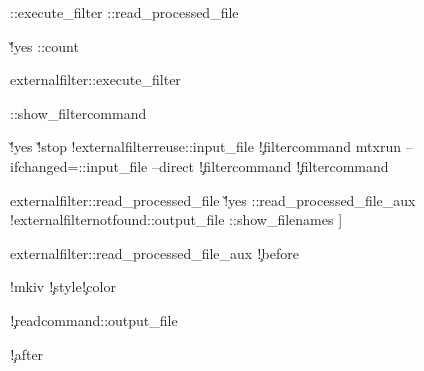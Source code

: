      \externalfilter::execute_filter
     \externalfilter::read_processed_file
     \endgroup 

     \v!yes
          {\doglobal\expandafter\increment\csname\externalfilter::count\endcsname}

     \dorechecknextindentation
\stoptexdefinition


\starttexdefinition externalfilter::execute_filter

   \externalfilter::show_filtercommand

   \v!yes
       {\v!stop
            {\showmessage\m!externalfilter{reuse}\externalfilter::input_file}
            {
               {
                   {
                    \executesystemcommand
                      {\externalfilterparameter\c!filtercommand}}
                   {\executesystemcommand
                    {mtxrun --ifchanged=\externalfilter::input_file\space 
                        --direct \externalfilterparameter\c!filtercommand}}}}}
       {\executesystemcommand
          {\externalfilterparameter\c!filtercommand}}
\stoptexdefinition


\starttexdefinition externalfilter::read_processed_file
    \v!yes
       {
           {\externalfilter::read_processed_file_aux}
           {\showmessage\m!externalfilter{notfound}\externalfilter::output_file 
            \externalfilter::show_filenames
            \blank
              {\tttf [[\getmessage\m!externalfilter{missing}]]}
            \blank}}
\stoptexdefinition

\starttexdefinition externalfilter::read_processed_file_aux
   \externalfilterparameter\c!before

   \begingroup
   \doifmode\s!mkiv
       {\dosetexternalfilterattributes\c!style\c!color}

   \directsetup
   \externalfilterparameter\c!readcommand\externalfilter::output_file
   \endgroup

   \externalfilterparameter\c!after
\stoptexdefinition


